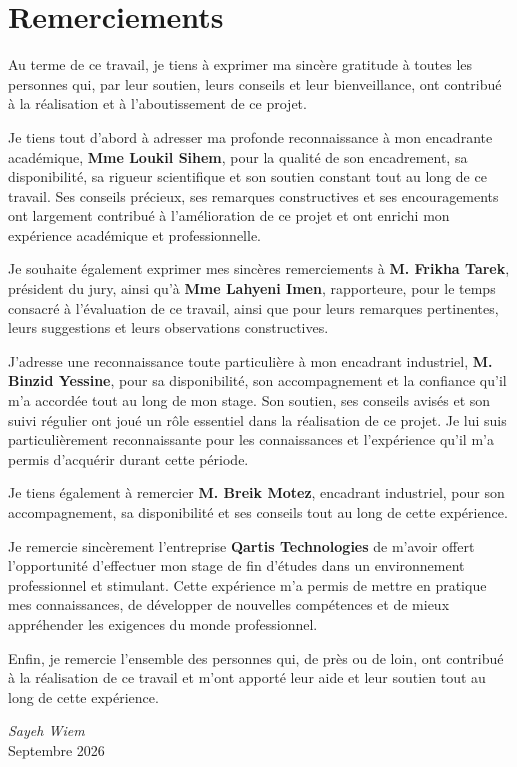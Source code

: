 
\chapter*{Remerciements}

Au terme de ce travail, je tiens à exprimer ma sincère gratitude à toutes les personnes qui, par leur soutien, leurs conseils et leur bienveillance, ont contribué à la réalisation et à l'aboutissement de ce projet.

Je tiens tout d'abord à adresser ma profonde reconnaissance à mon encadrante académique, \textbf{Mme Loukil Sihem}, pour la qualité de son encadrement, sa disponibilité, sa rigueur scientifique et son soutien constant tout au long de ce travail. Ses conseils précieux, ses remarques constructives et ses encouragements ont largement contribué à l'amélioration de ce projet et ont enrichi mon expérience académique et professionnelle.

Je souhaite également exprimer mes sincères remerciements à \textbf{M. Frikha Tarek}, président du jury, ainsi qu'à \textbf{Mme Lahyeni Imen}, rapporteure, pour le temps consacré à l'évaluation de ce travail, ainsi que pour leurs remarques pertinentes, leurs suggestions et leurs observations constructives.

J'adresse une reconnaissance toute particulière à mon encadrant industriel, \textbf{M. Binzid Yessine}, pour sa disponibilité, son accompagnement et la confiance qu'il m'a accordée tout au long de mon stage. Son soutien, ses conseils avisés et son suivi régulier ont joué un rôle essentiel dans la réalisation de ce projet. Je lui suis particulièrement reconnaissante pour les connaissances et l'expérience qu'il m'a permis d'acquérir durant cette période.

Je tiens également à remercier \textbf{M. Breik Motez}, encadrant industriel, pour son accompagnement, sa disponibilité et ses conseils tout au long de cette expérience.

Je remercie sincèrement l'entreprise \textbf{Qartis Technologies} de m'avoir offert l'opportunité d'effectuer mon stage de fin d'études dans un environnement professionnel et stimulant. Cette expérience m'a permis de mettre en pratique mes connaissances, de développer de nouvelles compétences et de mieux appréhender les exigences du monde professionnel.

Enfin, je remercie l'ensemble des personnes qui, de près ou de loin, ont contribué à la réalisation de ce travail et m'ont apporté leur aide et leur soutien tout au long de cette expérience.

\vfill

\begin{flushright}
\textit{Sayeh Wiem}\\
Septembre 2026
\end{flushright}

